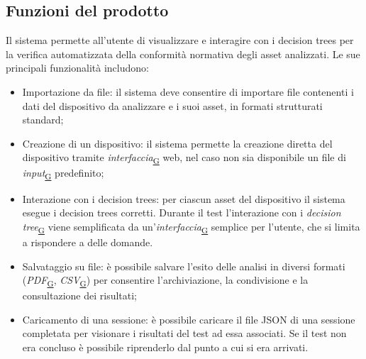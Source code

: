 \documentclass[a4paper,12pt]{article}
\begin{document}
    \subsection{Funzioni del prodotto}
        Il sistema permette all'utente di visualizzare e interagire con i decision trees per la verifica automatizzata della conformità normativa degli asset analizzati.
        \newline
        Le sue principali funzionalità includono:
        \begin{itemize}
            \item {\ttfamily Importazione da file:} il sistema deve consentire di importare file contenenti i dati del dispositivo da analizzare e i suoi asset, in formati strutturati standard;
            \item {\ttfamily Creazione di un dispositivo:} il sistema permette la creazione diretta del dispositivo tramite \textit{interfaccia}\textsubscript{\href{https://atlasteam9.github.io/Atlas/glossario.html\#Interfaccia}{G}} web, nel caso non sia disponibile un file di \textit{input}\textsubscript{\href{https://atlasteam9.github.io/Atlas/glossario.html\#Input}{G}} predefinito;
            \item {\ttfamily Interazione con i decision trees:} per ciascun asset del dispositivo il sistema esegue i decision trees corretti. Durante il test l'interazione con i \textit{decision tree}\textsubscript{\href{https://atlasteam9.github.io/Atlas/glossario.html\#DecisionTree}{G}} viene semplificata da un'\textit{interfaccia}\textsubscript{\href{https://atlasteam9.github.io/Atlas/glossario.html\#Interfaccia}{G}} semplice per l'utente, che si limita a rispondere a delle domande.  
            \item {\ttfamily Salvataggio su file:} è possibile salvare l'esito delle analisi in diversi formati (\textit{PDF}\textsubscript{\href{https://atlasteam9.github.io/Atlas/glossario.html\#PDF}{G}}, \textit{CSV}\textsubscript{\href{https://atlasteam9.github.io/Atlas/glossario.html\#CSV}{G}}) per consentire l'archiviazione, la condivisione e la consultazione dei risultati;
            \item {\ttfamily Caricamento di una sessione:} è possibile caricare il file JSON di una sessione completata per visionare i risultati del test ad essa associati. Se il test non era concluso è possibile riprenderlo dal punto a cui si era arrivati.
        \end{itemize}
    
    \newpage
\end{document}
